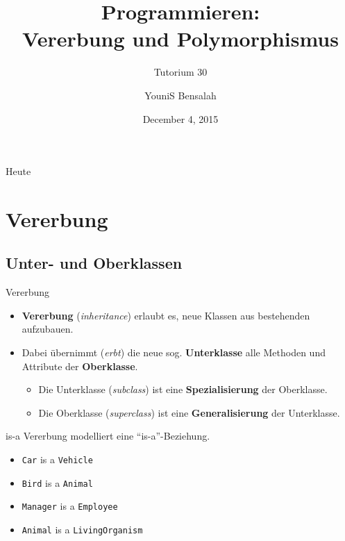 \documentclass[18pt]{beamer}
\title[Vererbung und Polymorphismus]{Programmieren:\\ Vererbung und Polymorphismus}
\subtitle{Tutorium 30}
\author{YouniS Bensalah}
\date{December 4, 2015}
\institute{Chair for Software Design and Quality}
\newcommand{\quotes}[1]{``#1''}
\begin{document}

\begin{frame}
\titlepage
\end{frame}

\begin{frame}{Heute}
\tableofcontents
\end{frame}

\section{Vererbung}

\subsection{Unter- und Oberklassen}

\begin{frame}{Vererbung}
    \begin{itemize}
        \item \textbf{Vererbung} (\textit{inheritance}) erlaubt es, neue Klassen aus bestehenden aufzubauen.
        \item Dabei übernimmt (\textit{erbt}) die neue sog. \textbf{Unterklasse} alle Methoden und Attribute der \textbf{Oberklasse}.
        \begin{itemize}
            \item Die Unterklasse (\textit{subclass}) ist eine \textbf{Spezialisierung} der Oberklasse.
            \item Die Oberklasse (\textit{superclass}) ist eine \textbf{Generalisierung} der Unterklasse.
        \end{itemize}

    \end{itemize}
\end{frame}

\begin{frame}{is-a}
    Vererbung modelliert eine \alert{\quotes{is-a}}-Beziehung.
    \vspace{.2in}
    \begin{itemize}
        \item \texttt{Car} \alert{is a} \texttt{Vehicle}
        \item \texttt{Bird} \alert{is a} \texttt{Animal}
        \item \texttt{Manager} \alert{is a} \texttt{Employee}
        \item \texttt{Animal} \alert{is a} \texttt{LivingOrganism}
    \end{itemize}
\end{frame}
\end{document}

